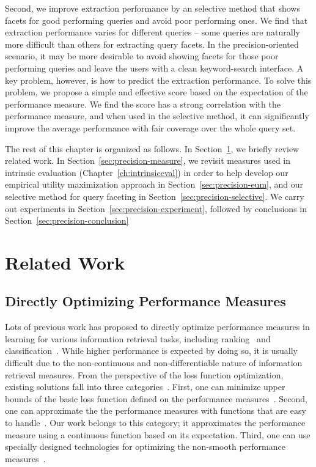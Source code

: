 Second, we improve extraction performance by an selective method that shows facets for good performing queries and avoid poor performing ones. We find that extraction performance varies for different queries -- some queries are naturally more difficult than others for extracting query facets. In the precision-oriented scenario, it may be more desirable to avoid showing facets for those poor performing queries and leave the users with a clean keyword-search interface. A key problem, however, is how to predict the extraction performance. To solve this problem, we propose a simple and effective score based on the expectation of the performance measure. We find the score has a strong correlation with the performance measure, and when used in the selective method, it can significantly improve the average performance with fair coverage over the whole query set.

The rest of this chapter is organized as follows. In Section~\ref{sec:precision-related}, we briefly review related work. In Section~\ref{sec:precision-measure}, we revisit \PRF measures used in intrinsic evaluation (Chapter~\ref{ch:intrinsiceval}) in order to help develop our empirical utility maximization approach in Section~\ref{sec:precision-eum}, and our selective method for query faceting in Section~\ref{sec:precision-selective}. We carry out experiments in Section~\ref{sec:precision-experiment}, followed by conclusions in Section~\ref{sec:precision-conclusion}
\section{Related Work}
\label{sec:precision-related}
\subsection{Directly Optimizing Performance Measures}
Lots of previous work has proposed to directly optimize performance measures in learning for various information retrieval tasks, including ranking~\cite{xu2008directly,xu2007adarank,cossock2006subset,quoc2007learning,de2007combined} and classification~\cite{musicant2003optimizing,joachims2005support,jansche2005maximum}. While higher performance is expected by doing so, it is usually difficult due to the non-continuous and non-differentiable nature of information retrieval measures. From the perspective of the loss function optimization, existing solutions fall into three categories~\cite{xu2008directly}. First, one can minimize upper bounds of the basic loss function defined on the performance measures~\cite{xu2007adarank,joachims2005support,yue2007support}. Second, one can approximate the the performance measures with functions that are easy to handle~\cite{jansche2005maximum,cossock2006subset}. Our work belongs to this category; it approximates the performance measure using a continuous function based on 
its expectation. Third, one can use specially designed technologies for optimizing the non-smooth performance measures~\cite{quoc2007learning,de2007combined}. 


